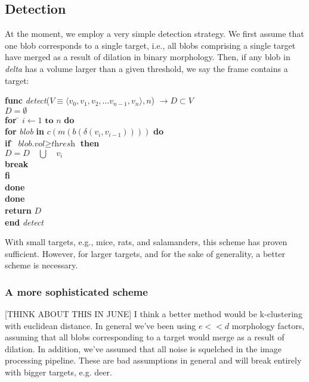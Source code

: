 \documentclass[letter]{article}
\begin{document}
\subsection{Detection}
At the moment, we employ a very simple detection strategy. We first assume that 
one blob corresponds to a single target, i.e., all blobs comprising
a single target have merged as a result of dilation in binary morphology. Then, if 
any blob in \textit{delta} has a volume larger than a given threshold, we say the 
frame contains a target: 
\begin{tabbing}
\textbf{func} \= \textit{detect}($V \equiv \langle v_0, v_1, v_2, \dots v_{n-1}, v_n \rangle, n$) 
 $\rightarrow D \subset V$\\
\> \+ $D = \emptyset$ \\
      \textbf{for} \= $i \leftarrow 1 \textbf{ to } n$ \textbf{do}\\
      \> \+ \textbf{for} \= \textit{blob} \textbf{in} $c(m(b(\delta(v_i, v_{i-1}))))$ \textbf{do}\\
           \> \+ \textbf{if} \= $\textit{blob.vol} \ge \textit{thresh}$ \textbf{then}\\
              \> \+ $D = D \quad \bigcup \quad {v_i}$\\
                    \textbf{break}\\ 
              \< \- \textbf{fi}\\ 
      \< \- \textbf{done}\\ 
     \< \- \textbf{done}\\ 
     \textbf{return} $D$\\ 
\< \- \textbf{end} \textit{detect}
\end{tabbing}

With small targets, e.g., mice, rats, and salamanders, this scheme has proven sufficient. 
However, for larger targets, and for the sake of generality, a better scheme is necessary. 

\subsubsection{A more sophisticated scheme}
[THINK ABOUT THIS IN JUNE] I think a better method would be k-clustering with euclidean 
distance. In general we've been using $e << d$ morphology factors, assuming that all 
blobs corresponding to a target would merge as a result of dilation. In addition, we've
assumed that all noise is squelched in the image processing pipeline. These are bad 
assumptions in general and will break entirely with bigger targets, e.g. deer. 
\end{document}

